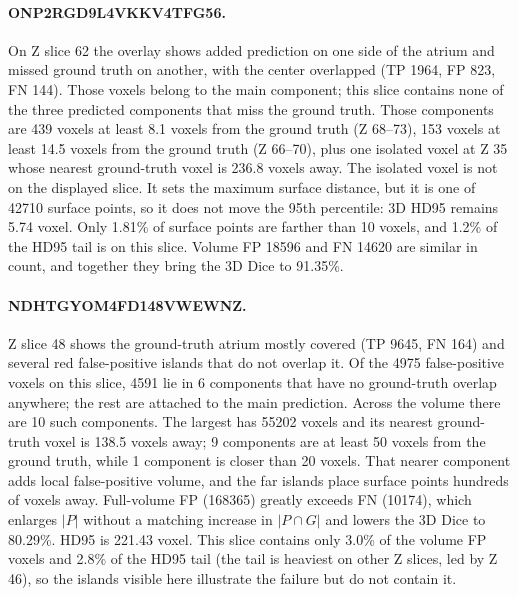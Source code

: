 \documentclass{article}
\begin{document}
\paragraph{ONP2RGD9L4VKKV4TFG56.}
On Z slice 62 the overlay shows added prediction on one side of the atrium and missed ground truth on another, with the center overlapped (TP 1964, FP 823, FN 144). Those voxels belong to the main component; this slice contains none of the three predicted components that miss the ground truth. Those components are 439 voxels at least 8.1 voxels from the ground truth (Z 68--73), 153 voxels at least 14.5 voxels from the ground truth (Z 66--70), plus one isolated voxel at Z 35 whose nearest ground-truth voxel is 236.8 voxels away. The isolated voxel is not on the displayed slice. It sets the maximum surface distance, but it is one of 42710 surface points, so it does not move the 95th percentile: 3D HD95 remains 5.74 voxel. Only 1.81\% of surface points are farther than 10 voxels, and 1.2\% of the HD95 tail is on this slice. Volume FP 18596 and FN 14620 are similar in count, and together they bring the 3D Dice to 91.35\%.

\paragraph{NDHTGYOM4FD148VWEWNZ.}
Z slice 48 shows the ground-truth atrium mostly covered (TP 9645, FN 164) and several red false-positive islands that do not overlap it. Of the 4975 false-positive voxels on this slice, 4591 lie in 6 components that have no ground-truth overlap anywhere; the rest are attached to the main prediction. Across the volume there are 10 such components. The largest has 55202 voxels and its nearest ground-truth voxel is 138.5 voxels away; 9 components are at least 50 voxels from the ground truth, while 1 component is closer than 20 voxels. That nearer component adds local false-positive volume, and the far islands place surface points hundreds of voxels away. Full-volume FP (168365) greatly exceeds FN (10174), which enlarges $|P|$ without a matching increase in $|P \cap G|$ and lowers the 3D Dice to 80.29\%. HD95 is 221.43 voxel. This slice contains only 3.0\% of the volume FP voxels and 2.8\% of the HD95 tail (the tail is heaviest on other Z slices, led by Z 46), so the islands visible here illustrate the failure but do not contain it.
\end{document}
